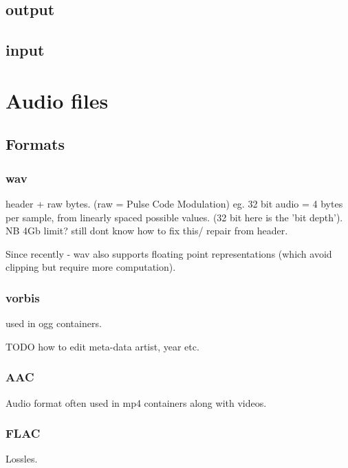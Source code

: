 \documentclass[oneside,english]{scrbook}
\begin{document}
\section{output}


\section{input}

\chapter{Audio files}

\section{Formats}
\subsection{wav}

header + raw bytes. (raw = Pulse Code Modulation) eg. 32 bit audio = 4 bytes per sample, from linearly spaced possible values. (32 bit here is the 'bit depth').
NB 4Gb limit? still dont know how to fix this/ repair from header.

Since recently - wav also supports floating point representations (which avoid clipping but require more computation).

\subsection{vorbis}
used in ogg containers.

TODO how to edit meta-data artist, year etc.

\subsection{AAC}
Audio format often used in mp4 containers along with videos.

\subsection{FLAC}
Lossles.
\end{document}
